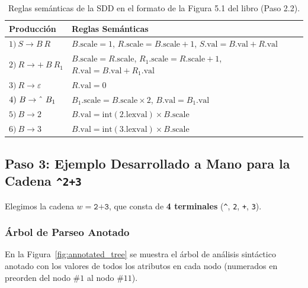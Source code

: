 \documentclass[11pt,a4paper]{article}
\begin{document}
\begin{table}[htbp]
\centering
\begin{tabular}{@{}ll@{}}
\toprule
\textbf{Producci\'on} & \textbf{Reglas Sem\'anticas} \\
\midrule
$1)\ S \to B\ R$ & $B.\text{scale} = 1$, \quad $R.\text{scale} = B.\text{scale} + 1$, \quad $S.\text{val} = B.\text{val} + R.\text{val}$ \\
$2)\ R \to +\ B\ R_1$ & $B.\text{scale} = R.\text{scale}$, \quad $R_1.\text{scale} = R.\text{scale} + 1$, \quad $R.\text{val} = B.\text{val} + R_1.\text{val}$ \\
$3)\ R \to \varepsilon$ & $R.\text{val} = 0$ \\
$4)\ B \to \text{\^{}}\ B_1$ & $B_1.\text{scale} = B.\text{scale} \times 2$, \quad $B.\text{val} = B_1.\text{val}$ \\
$5)\ B \to 2$ & $B.\text{val} = \text{int}(2.\text{lexval}) \times B.\text{scale}$ \\
$6)\ B \to 3$ & $B.\text{val} = \text{int}(3.\text{lexval}) \times B.\text{scale}$ \\
\bottomrule
\end{tabular}
\caption{Reglas sem\'anticas de la SDD en el formato de la Figura 5.1 del libro (Paso 2.2).}
\label{tab:rules}
\end{table}

\subsection{Paso 3: Ejemplo Desarrollado a Mano para la Cadena \texttt{\^{}2+3}}
Elegimos la cadena $w = \texttt{\^{}2+3}$, que consta de \textbf{4 terminales} (\texttt{\^{}}, \texttt{2}, \texttt{+}, \texttt{3}).

\subsubsection{\'Arbol de Parseo Anotado}
En la Figura~\ref{fig:annotated_tree} se muestra el \'arbol de an\'alisis sint\'actico anotado con los valores de todos los atributos en cada nodo (numerados en preorden del nodo $\#1$ al nodo $\#11$).
\end{document}
